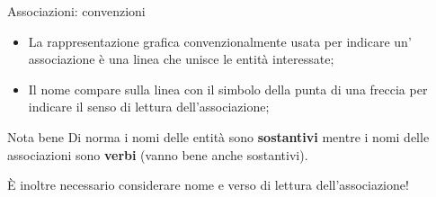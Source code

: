 %
\begin{frame}{Associazioni: convenzioni}

\begin{itemize}
    \item La rappresentazione grafica convenzionalmente usata per indicare un' associazione \`e una linea che unisce le entit\`a interessate;
    \item Il nome compare sulla linea con il simbolo della punta di una freccia per indicare il senso di lettura dell'associazione;
\end{itemize}
\pause
\begin{center}
\end{center}
\pause
\begin{block}{Nota bene}
    Di norma i nomi delle entit\`a sono \textbf{sostantivi} mentre i nomi delle associazioni sono \textbf{verbi} (vanno bene anche sostantivi).
    \pause

    \`E inoltre necessario considerare nome e verso di lettura dell'associazione!
\end{block}
\end{frame}
%
